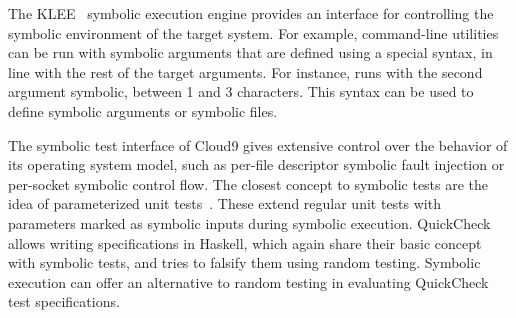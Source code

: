 The KLEE~\cite{klee} symbolic execution engine provides an interface for controlling the symbolic environment of the target system.  For example, command-line utilities can be run with symbolic arguments that are defined using a special syntax, in line with the rest of the target arguments.  For instance,  runs  with the second argument symbolic, between 1 and 3 characters.  This syntax can be used to define symbolic arguments or symbolic files.

The symbolic test interface of Cloud9 gives extensive control over the behavior of its operating system model, such as per-file descriptor symbolic fault injection or per-socket symbolic control flow.
%
The closest concept to symbolic tests are the idea of parameterized unit tests~\cite{tillmann-puts}. These extend regular unit tests with parameters marked as symbolic inputs during symbolic execution.
%
QuickCheck~\cite{quickcheck} allows writing specifications in Haskell, which again share their basic concept with symbolic tests, and tries to falsify them using random testing.  Symbolic execution can offer an alternative to random testing in evaluating QuickCheck test specifications.


\iffalse
\section{UNSORTED}

Closely related to symbolic execution is the concept of bounded model checking (BMC).  Instead of exploring individual execution paths and generate test cases, a BMC unfolds the control flow graph of the program and constructs a verification condition---a formula encompassing the behavior of the entire program with respect to a property to be checked.  Popular model checkers include CBMC~\cite{cbmc}, LLBMC~\cite{llbmc2012}, F-Soft~\cite{f-soft}, Magic~\cite{magic}, or Saturn~\cite{saturn}.

Beyond symbolic execution, there is substantial work done in the field of model checking and formal methods in general, which goes beyond the scope of this thesis.  We refer the interested reader to survey papers that cover the topic in more breadth~\cite{jhala2009software, woodcock2009formal}.

Black-box (random) fuzzing.

Unsound approaches.

Cooperative symbolic execution (where the program uses special APIs of the engine).

OVerify.
\fi





